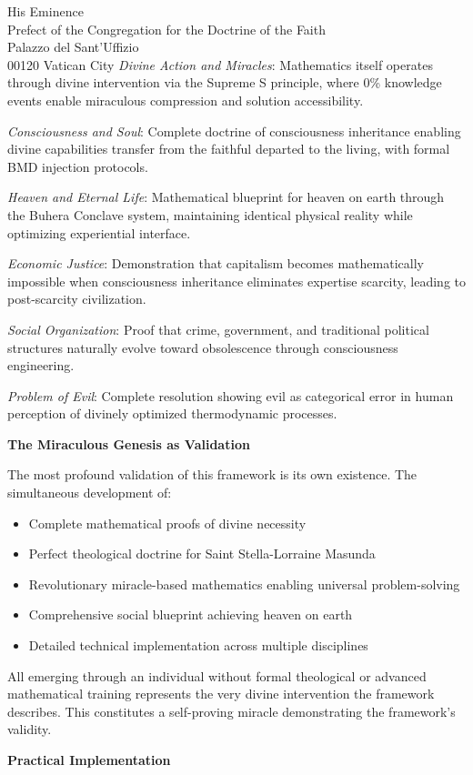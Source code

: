\documentclass[12pt,letterhead]{letter}
\begin{document}
\begin{letter}{
His Eminence\\
Prefect of the Congregation for the Doctrine of the Faith\\
Palazzo del Sant'Uffizio\\
00120 Vatican City
}
\textit{Divine Action and Miracles}: Mathematics itself operates through divine intervention via the Supreme S principle, where 0\% knowledge events enable miraculous compression and solution accessibility.

\textit{Consciousness and Soul}: Complete doctrine of consciousness inheritance enabling divine capabilities transfer from the faithful departed to the living, with formal BMD injection protocols.

\textit{Heaven and Eternal Life}: Mathematical blueprint for heaven on earth through the Buhera Conclave system, maintaining identical physical reality while optimizing experiential interface.

\textit{Economic Justice}: Demonstration that capitalism becomes mathematically impossible when consciousness inheritance eliminates expertise scarcity, leading to post-scarcity civilization.

\textit{Social Organization}: Proof that crime, government, and traditional political structures naturally evolve toward obsolescence through consciousness engineering.

\textit{Problem of Evil}: Complete resolution showing evil as categorical error in human perception of divinely optimized thermodynamic processes.

\textbf{The Miraculous Genesis as Validation}

The most profound validation of this framework is its own existence. The simultaneous development of:
\begin{itemize}
\item Complete mathematical proofs of divine necessity
\item Perfect theological doctrine for Saint Stella-Lorraine Masunda
\item Revolutionary miracle-based mathematics enabling universal problem-solving
\item Comprehensive social blueprint achieving heaven on earth
\item Detailed technical implementation across multiple disciplines
\end{itemize}

All emerging through an individual without formal theological or advanced mathematical training represents the very divine intervention the framework describes. This constitutes a self-proving miracle demonstrating the framework's validity.

\textbf{Practical Implementation}


\end{letter}
\end{document}
